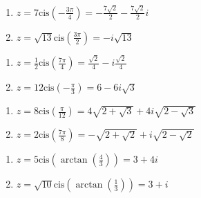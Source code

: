 \begin{multicols}{2} 

\begin{enumerate}

\setcounter{enumi}{\value{HW}}

\item $z = 7\text{cis}\left(-\frac{3\pi}{4}\right) = -\frac{7\sqrt{2}}{2} - \frac{7\sqrt{2}}{2}i$ 
\item $z = \sqrt{13}\text{cis}\left(\frac{3\pi}{2}\right) = -i\sqrt{13}$ 

\setcounter{HW}{\value{enumi}}

\end{enumerate}

\end{multicols}

\begin{multicols}{2} 

\begin{enumerate}

\setcounter{enumi}{\value{HW}}

\item $z = \frac{1}{2}\text{cis}\left(\frac{7\pi}{4}\right) = \frac{\sqrt{2}}{4} - i\frac{\sqrt{2}}{4}$ 
\item $z = 12\text{cis}\left(-\frac{\pi}{3}\right) = 6 - 6i\sqrt{3}$ 

\setcounter{HW}{\value{enumi}}

\end{enumerate}

\end{multicols}

\begin{multicols}{2} 

\begin{enumerate}

\setcounter{enumi}{\value{HW}}

\item $z = 8\text{cis}\left(\frac{\pi}{12}\right) = 4\sqrt{2+\sqrt{3}}+4i\sqrt{2-\sqrt{3}}$ 
\item $z = 2\text{cis}\left(\frac{7\pi}{8}\right) = -\sqrt{2 + \sqrt{2}} + i\sqrt{2 - \sqrt{2}}$ 

\setcounter{HW}{\value{enumi}}

\end{enumerate}

\end{multicols}

\begin{multicols}{2} 

\begin{enumerate}

\setcounter{enumi}{\value{HW}}

\item $z = 5\text{cis}\left(\arctan\left(\frac{4}{3}\right)\right) = 3 + 4i$ 
\item $z = \sqrt{10}\text{cis}\left(\arctan\left(\frac{1}{3}\right)\right) = 3+i$ 

\setcounter{HW}{\value{enumi}}

\end{enumerate}

\end{multicols}

